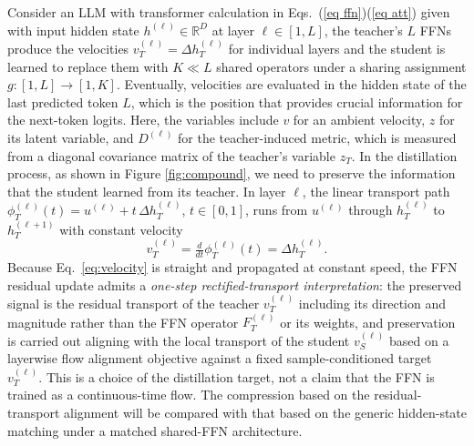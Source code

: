 \documentclass[letterpaper]{article} %
\newcommand{\R}{\mathbb{R}}
\newcommand{\bD}{D}
\theoremstyle{plain}
\theoremstyle{definition}
\begin{document}
Consider an LLM with transformer calculation in Eqs.~(\ref{eq ffn})(\ref{eq att}) given with input hidden state $h^{(\ell)}\in\R^D$ at layer $\ell\in[1,L]$, the teacher's $L$ FFNs produce the velocities $v_T^{(\ell)}=\Delta h_T^{(\ell)}$ for individual layers and the student is learned to replace them with $K\ll L$ shared operators under a sharing assignment $g:[1,L]\to[1,K]$. Eventually, velocities are evaluated in the hidden state of the {last predicted token} $L$, which is the position that provides crucial information for the next-token logits. Here, the variables include $v$ for an ambient velocity, $z$ for its latent variable, and $\bD^{(\ell)}$ for the teacher-induced metric, which is measured from a diagonal covariance matrix of the teacher's variable $z_T$. In the distillation process, as shown in Figure \ref{fig:compound}, we need to preserve the information that the student learned from its teacher. In layer $\ell$, the linear transport path $\phi_T^{(\ell)}(t)=u^{(\ell)}+t\,\Delta h_T^{(\ell)}$, $t\in[0,1]$, runs from $u^{(\ell)}$ through $h_T^{(\ell)}$ to $h_T^{(\ell+1)}$ with constant velocity
\begin{equation}
  v_T^{(\ell)}=\tfrac{d}{dt}\phi_T^{(\ell)}(t)=\Delta h_T^{(\ell)}.
  \label{eq:velocity}
\end{equation}
Because Eq.~\eqref{eq:velocity} is straight and propagated at constant speed, the FFN residual update admits a \emph{one-step rectified-transport interpretation}: the preserved signal is the residual transport of the teacher $v_T^{(\ell)}$ including its direction and magnitude rather than the FFN operator $F_T^{(\ell)}$ or its weights, and preservation is carried out aligning with the local transport of the student $v_S^{(\ell)}$ based on a layerwise flow alignment objective against a fixed sample-conditioned target $v_T^{(\ell)}$. This is a {choice} of the distillation target, not a claim that the FFN is trained as a continuous-time flow. The compression based on the residual-transport alignment will be compared with that based on the generic hidden-state matching under a matched shared-FFN architecture.

\end{document}
